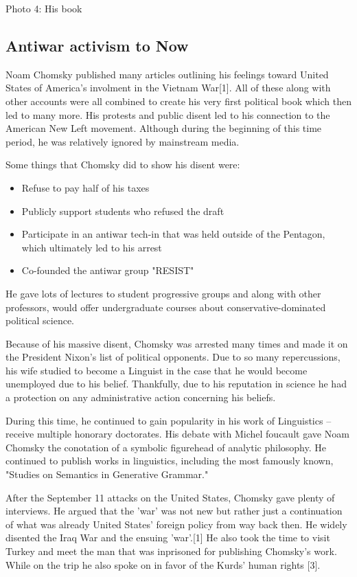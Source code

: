 \documentclass[conference]{IEEEtran}
\begin{document}
Photo 4: His book
\subsection{Antiwar activism to Now}

Noam Chomsky published many articles outlining his feelings toward United States of America's involment in the Vietnam War[1]. All of these along with other accounts were all combined to create his very first political book which then led to many more. His protests and public disent led to his connection to the American New Left movement. Although during the beginning of this time period, he was relatively ignored by mainstream media.

Some things that Chomsky did to show his disent were: 
\begin{itemize}
\item Refuse to pay half of his taxes 
\item Publicly support students who refused the draft
\item Participate in an antiwar tech-in that was held outside of the Pentagon, which ultimately led to his arrest
\item Co-founded the antiwar group "RESIST"
\end{itemize}
He gave lots of lectures to student progressive groups and along with other professors, would offer undergraduate courses about conservative-dominated political science. 

Because of his massive disent, Chomsky was arrested many times and made it on the President Nixon's list of political opponents. Due to so many repercussions, his wife studied to become a Linguist in the case that he would become unemployed due to his belief. Thankfully, due to his reputation in science he had a protection on any administrative action concerning his beliefs.

During this time, he continued to gain popularity in his work of Linguistics -- receive multiple honorary doctorates. His debate with Michel foucault gave Noam Chomsky the conotation of a symbolic figurehead of analytic philosophy. He continued to publish works in linguistics, including the most famously known, "Studies on Semantics in Generative Grammar."

After the September 11 attacks on the United States, Chomsky gave plenty of interviews. He argued that the 'war' was not new but rather just a continuation of what was already United States' foreign policy from way back then. He widely disented the Iraq War and the ensuing 'war'.[1] He also took the time to visit Turkey and meet the man that was inprisoned for publishing Chomsky's work. While on the trip he also spoke on in favor of the Kurds' human rights [3]. 
\end{document}
